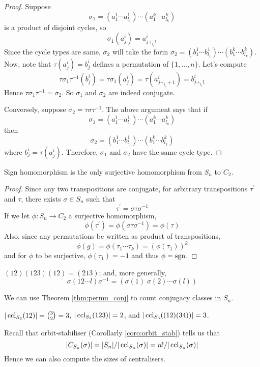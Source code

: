\documentclass[10pt, a4paper, twoside]{report}
\begin{document}
\begin{proof}
    Suppose \[\sigma_1=(a_1^1\cdots a_{l_1}^1)\cdots(a_1^k\cdots a_{l_k}^k)\] is a product of disjoint cycles, so \[\sigma_1(a_j^i)=a_{j+_{l_i}1}^i\] Since the cycle types are same, \(\sigma_2\) will take the form \(\sigma_2=(b_1^1\cdots b_{l_1}^1)\cdots(b_1^k\cdots b_{l_k}^k)\). Now, note that \(\tau(a_j^i)=b_j^i\) defines a permutation of \(\{1,\ldots,n\}\). Let's compute 
    \[\tau\sigma_1\tau^{-1}(b_j^i)=\tau\sigma_1(a_j^i)=\tau(a_{j+_{l_i}+1}^i)=b_{j+_{l_i}1}^i\]
    Hence \(\tau\sigma_1\tau^{-1}=\sigma_2\). So \(\sigma_1\) and \(\sigma_2\) are indeed conjugate.

    Conversely, suppose \(\sigma_2=\tau\sigma\tau^{-1}\). The above argument says that if \[\sigma_1=(a_1^1\cdots a_{l_1}^1)\cdots(a_1^k\cdots a_{l_k}^k)\] then 
    \[\sigma_2=(b_1^1\cdots b_{l_1}^1)\cdots(b_1^k\cdots b_{l_k}^k)\]
    where \(b_j^i=\tau(a_j^i)\). Therefore, \(\sigma_1\) and \(\sigma_2\) have the same cycle type.
\end{proof}
\begin{proposition}
    Sign homomorphism is the only surjective homomorphism from \(S_n\) to \(C_2\). 
\end{proposition}
\begin{proof}
    Since any two transpositions are conjugate, for arbitrary transpositions \(\tau^\prime\) and \(\tau\), there exists \(\sigma\in S_n\) such that 
    \[\tau^\prime=\sigma\tau\sigma^{-1}\]
    If we let \(\phi:S_n\to C_2\) a surjective homomorphism,
    \[\phi(\tau^\prime)=\phi(\sigma\tau\sigma^{-1})=\phi(\tau)\]
    Also, since any permutations be written as product of transpositions,
    \[\phi(g)=\phi(\tau_1\cdots\tau_k)=(\phi(\tau_1))^k\]
    and for \(\phi\) to be surjective, \(\phi(\tau_1)=-1\) and thus \(\phi=\operatorname{sgn}\).
\end{proof}
\begin{example}
    \((12)(123)(12)=(213)\); and, more generally, 
    \[\sigma(12\cdots l)\sigma^{-1}=\left(\sigma(1)\;\sigma(2)\cdots\sigma(l)\right)\]
\end{example}
We can use Theorem \ref{thm:permu_conj} to count conjugacy classes in \(S_n\).
\begin{example}
    \(|\operatorname{ccl}_{S_3}(12)|=\binom 32=3\), \(|\operatorname{ccl}_{S_3}(123)|=2\), and \(|\operatorname{ccl}_{S_3}((12)(34))|=3\).
\end{example}
Recall that orbit-stabiliser (Corollarly \ref{coro:orbit_stab}) tells us that 
\[|C_{S_n}(\sigma)|=|S_n|/|\operatorname{ccl}_{S_n}(\sigma)|=n!/|\operatorname{ccl}_{S_n}(\sigma)|\]
Hence we can also compute the sizes of centralisers.
\end{document}
